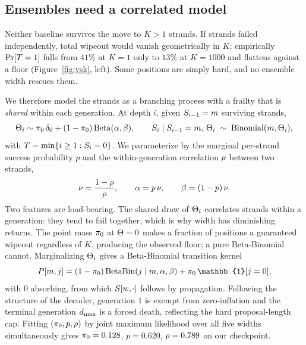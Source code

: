 \documentclass{article} %
\makeatletter
\newenvironment{ai}
  {\color{lightgray}%
   \@ifpackageloaded{caption}{\captionsetup{font={color=lightgray}}}{}%
   \let\ai@savedfloatreset\@floatboxreset
   \g@addto@macro\@floatboxreset{\color{lightgray}}}
  {\global\let\@floatboxreset\ai@savedfloatreset}
\makeatother
\begin{document}
\begin{ai}
\subsection{Ensembles need a correlated model}
\label{sec:branching}

Neither baseline survives the move to $K > 1$ strands. If strands failed
independently, total wipeout would vanish geometrically in $K$; empirically
$\Pr[T = 1]$ falls from $41\%$ at $K = 1$ only to $13\%$ at $K = 1000$ and
flattens against a floor (Figure~\ref{fig:vsk}, left). Some positions are simply
hard, and no ensemble width rescues them.

We therefore model the strands as a branching process with a frailty that is
\emph{shared} within each generation. At depth $i$, given $S_{i-1} = m$
surviving strands,
\begin{equation}
  \Theta_i \sim \pi_0 \, \delta_0 + (1 - \pi_0)\,\mathrm{Beta}(\alpha, \beta),
  \qquad
  S_i \mid S_{i-1} = m,\, \Theta_i \;\sim\; \mathrm{Binomial}(m, \Theta_i),
  \label{eq:branching}
\end{equation}
with $T = \min\{i \geq 1 : S_i = 0\}$. We parameterize by the
marginal per-strand success probability $p$ and the within-generation correlation
$\rho$ between two strands,
\begin{equation}
  \nu = \frac{1 - \rho}{\rho}, \qquad \alpha = p\,\nu, \qquad \beta = (1-p)\,\nu .
  \label{eq:reparam}
\end{equation}
Two features are load-bearing. The shared draw of $\Theta_i$ correlates strands
within a generation: they tend to fail together, which is why width has
diminishing returns. The point mass $\pi_0$ at $\Theta = 0$ makes a fraction of
positions a guaranteed wipeout regardless of $K$, producing the observed floor;
a pure Beta-Binomial cannot. Marginalizing $\Theta_i$ gives a Beta-Binomial
transition kernel
\begin{equation}
  P[m, j] = (1 - \pizero)\,\BetaBin(j \mid m, \alpha, \beta) + \pizero \, \mathbb{1}[j = 0],
  \label{eq:kernel}
\end{equation}
with $0$ absorbing, from which $S[w, \cdot]$ follows by propagation. Following
the structure of the decoder, generation $1$ is exempt from zero-inflation and
the terminal generation $d_{\max}$ is a forced death, reflecting the hard
proposal-length cap. Fitting $(\pi_0, p, \rho)$ by joint maximum likelihood
over all five widths simultaneously gives
$\pi_0 = 0.128$, $p = 0.620$, $\rho = 0.789$ on our checkpoint.


\end{ai}
\end{document}

